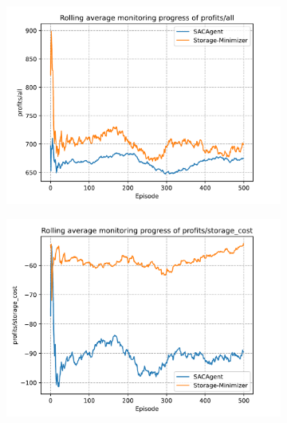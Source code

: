 \begin{figure}[ht]
	\centering
	\begin{subfigure}{0.33\textwidth}
		\centering
		\includegraphics[width = \textwidth]{images/experiments/SACDuopolyOtherComp/SACOtherCompProfitsAll.pdf}\\
		\label{fig:SACDuopolyOtherCompetitors1}
	\end{subfigure}
	\begin{subfigure}{0.32\textwidth}
		\centering
		\includegraphics[width = \textwidth]{images/experiments/SACDuopolyOtherComp/SACOtherCompStorageCosts.pdf}\\
		\label{fig:SACDuopolyOtherCompetitors2}
	\end{subfigure}
	\begin{subfigure}{0.33\textwidth}

\end{subfigure}
\end{figure}
